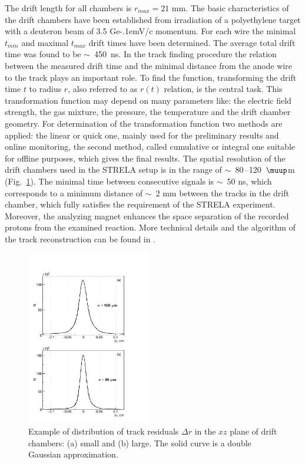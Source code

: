 \documentclass[twocolumn,epjc3]{svjour3}
\newcommand{\GeVc}   {Ge\kern-.1emV/c\xspace}
\begin{document}
The drift length for all chambers is $r_{max} = 21$ mm. The basic
characteristics of the drift chambers have been established from irradiation of
a polyethylene target with a deuteron beam of 3.5 \GeVc momentum. For each wire
the minimal $t_{min}$ and maximal $t_{max}$ drift times have been
determined. The average total drift time was found to be $\sim$~450~ns. In the
track finding procedure the relation between the measured drift time and the
minimal distance from the anode wire to the track plays an important role. To
find the function, transforming the drift time $t$ to radius $r$, also referred
to as $r(t)$ relation, is the central task. This transformation function may
depend on many parameters like: the electric field strength, the gas mixture,
the pressure, the temperature and the drift chamber geometry. For determination
of the transformation function two methods are applied: the linear or quick one,
mainly used for the preliminary results and online monitoring, the second
method, called cumulative or integral one suitable for offline purposes, which
gives the final results. The spatial resolution of the drift chambers used in
the STRELA setup is in the range of $\sim$~80\,--120~$\muup$m
(Fig.~\ref{fig:res_chambers}). The minimal time between consecutive signals is
$\sim$~50 ns, which corresponds to a minimum distance of $\sim$~2 mm between the
tracks in the drift chamber, which fully satisfies the requirement of the STRELA
experiment. Moreover, the analyzing magnet enhances the space separation of the
recorded protons from the examined reaction. More technical details and the
algorithm of the track reconstruction can be found in \cite{gla13}.

\begin{figure}[ht]
  \centering
  \includegraphics[width=0.48\textwidth]{res_chambers.pdf}
  \caption{Example of distribution of track residuals $\Delta r$ in the $xz$
    plane of drift chambers: (a) small and (b) large. The solid curve is a
    double Gaussian approximation.}
  \label{fig:res_chambers}
\end{figure}
\end{document}
